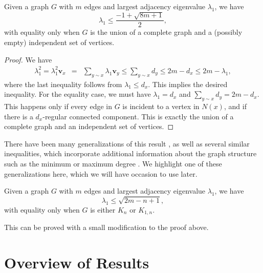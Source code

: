 \begin{theorem}
  Given a graph $G$ with $m$ edges and largest adjacency eigenvalue $\lambda_1$, we have
  \[ \lambda_1 \leq \frac{-1 + \sqrt{8m + 1}}{2} ,\]
  with equality only when $G$ is the union of a complete graph and a (possibly empty) independent set of vertices.
\end{theorem}
\begin{proof}
  We have
  \begin{eqnarray*}
    \lambda_1^2 = \lambda_1^2 \mathbf{v}_x & = & \sum_{y \sim x} \lambda_1 \mathbf{v}_y \leq \sum_{y \sim x} d_y \leq 2m - d_x \leq 2m - \lambda_1, 
  \end{eqnarray*}
  where the last inequality follows from $\lambda_1 \leq d_x$.  This implies the desired inequality.  For the equality case, we must have
  $\lambda_1 = d_x$ and $\sum_{y \sim x} d_y = 2m - d_x$.  This happens only if every edge in $G$ is incident to a vertex in $N(x)$,
  and if there is a $d_x$-regular connected component.  This is exactly the union of a complete graph and an independent set of vertices. 
  
\end{proof}


There have been many generalizations of this result \cite{Friedland1988, Hong1988, HongEtAl2001, Nikiforov2002, DasKumar2004},
as well as several
similar inequalities, which incorporate additional information about the graph structure
such as the minimum or maximum degree \cite{FavaronMaheoSacle1993, BermanZhang2001, Nikiforov2006Walks}.  We highlight one of these generalizations here, which we will have occasion to use later.

\begin{theorem}
  Given a graph $G$ with $m$ edges and largest adjacency eigenvalue $\lambda_1$, we have
  \[ \lambda_1 \leq \sqrt{2m - n + 1} ,\]
  with equality only when $G$ is either $K_n$ or $K_{1,n}$.
\end{theorem}
\noindent This can be proved with a small modification to the proof above.  


\section{Overview of Results}

